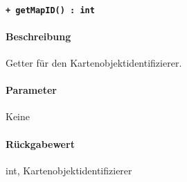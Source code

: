 \paragraph{\texttt{+ getMapID() : int}}\label{AP_Alias_getMapID}%
\paragraph*{Beschreibung}
Getter für den Kartenobjektidentifizierer.
\paragraph*{Parameter}
Keine
\paragraph*{Rückgabewert}
int, Kartenobjektidentifizierer